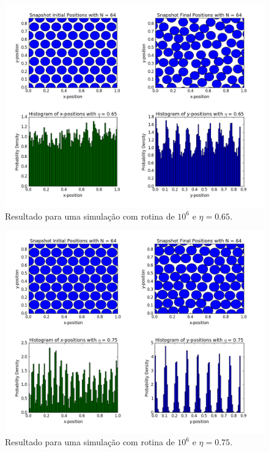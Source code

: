 \documentclass[%
reprint,
amsmath,amssymb,
aps,
12pt
]{revtex4-1}
\begin{document}
\begin{figure}[!h]
	\centering
	\includegraphics[scale=0.3]{md065.png}
	\caption{Resultado para uma simulação com rotina de $ 10^6 $ e $ \eta = 0.65 $.
		\label{md065}}
\end{figure}
\begin{figure}[!h]
	\centering
	\includegraphics[scale=0.3]{md075.png}
	\caption{Resultado para uma simulação com rotina de $ 10^6 $ e $ \eta = 0.75 $.
		\label{md075}}
\end{figure}
\end{document}

